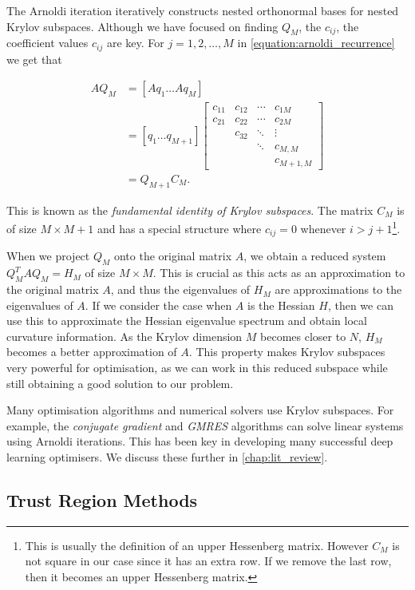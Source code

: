 The Arnoldi iteration iteratively constructs nested orthonormal bases for nested Krylov subspaces. Although we have focused on finding $Q_M$, the $c_{ij}$, the coefficient values $c_{ij}$ are key. For $j = 1,2,\ldots,M$ in \cref{equation:arnoldi_recurrence} we get that

\begin{align}
AQ_M &= [Aq_1 \ldots Aq_M] \nonumber \\
&= [q_1 \ldots q_{M+1}]
\begin{bmatrix} 
c_{11} & c_{12} & \cdots & c_{1M} \\ 
c_{21} & c_{22} & \cdots & c_{2M} \\ 
       & c_{32} & \ddots & \vdots \\ 
       &        & \ddots & c_{M,M} \\
       &        &        & c_{M+1,M}
\end{bmatrix} \nonumber \\
&= Q_{M+1} C_M.
\label{equation:arnoldi_identity}
\end{align}

This is known as the \textit{fundamental identity of Krylov subspaces}. The matrix $C_M$ is of size $M \times M+1$ and has a special structure where $c_{ij} = 0$ whenever $i > j + 1$\footnote{This is usually the definition of an upper Hessenberg matrix. However $C_M$ is not square in our case since it has an extra row. If we remove the last row, then it becomes an upper Hessenberg matrix.}.

When we project $Q_M$ onto the original matrix $A$, we obtain a reduced system $Q_M^T A Q_M = H_M$ of size $M \times M$. This is crucial as this acts as an approximation to the original matrix $A$, and thus the eigenvalues of $H_M$ are approximations to the eigenvalues of $A$. If we consider the case when $A$ is the Hessian $H$, then we can use this to approximate the Hessian eigenvalue spectrum and obtain local curvature information. As the Krylov dimension $M$ becomes closer to $N$, $H_M$ becomes a better approximation of $A$. This property makes Krylov subspaces very powerful for optimisation, as we can work in this reduced subspace while still obtaining a good solution to our problem.

Many optimisation algorithms and numerical solvers use Krylov subspaces. For example, the \textit{conjugate gradient} and \textit{GMRES} algorithms can solve linear systems using Arnoldi iterations. 
This has been key in developing many successful deep learning optimisers. We discuss these further in \cref{chap:lit_review}.

\subsection{Trust Region Methods}
\label{ssec:trust_region_methods}

